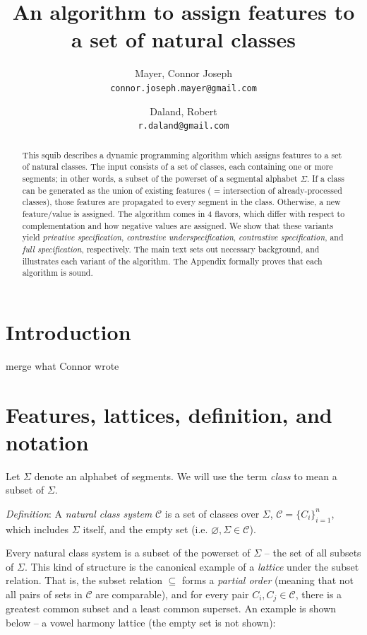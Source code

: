 \documentclass[11pt, oneside]{article}   	%
\title{An algorithm to assign features to a set of natural classes}
\author{}
\author{
  Mayer, Connor Joseph \\
  \texttt{connor.joseph.mayer@gmail.com}
  \and
  Daland, Robert \\
  \texttt{r.daland@gmail.com}
}
\begin{document}
\maketitle

\begin{abstract}
This squib describes a dynamic programming algorithm which assigns features to a set of natural classes. The input consists of a set of classes, each containing one or more segments; in other words, a subset of the powerset of a segmental alphabet $\Sigma$. If a class can be generated as the union of existing features ( = intersection of already-processed classes), those features are propagated to every segment in the class. Otherwise, a new feature/value is assigned. The algorithm comes in 4 flavors, which differ with respect to complementation and how negative values are assigned. We show that these variants yield \textit{privative specification}, \textit{contrastive underspecification}, \textit{contrastive specification}, and \textit{full specification}, respectively. The main text sets out necessary background, and illustrates each variant of the algorithm. The Appendix formally proves that each algorithm is sound.
\end{abstract}

\section{Introduction}
merge what Connor wrote

\section{Features, lattices, definition, and notation}

Let $\Sigma$ denote an alphabet of segments. We will use the term \textit{class} to mean a subset of $\Sigma$. 

\vspace{\baselineskip} \noindent \textit{Definition}:
        A \textit{natural class system} $\mathcal C$ is a set of classes over $\Sigma$, $\mathcal C = \{C_i\}_{i=1}^n$, which includes $\Sigma$ itself, and the empty set (i.e. $\varnothing , \Sigma \in \mathcal C$).

\vspace{\baselineskip} \noindent Every natural class system is a subset of the powerset of $\Sigma$ -- the set of all subsets of $\Sigma$. This kind of structure is the canonical example of a \textit{lattice} under the subset relation. That is, the subset relation $\subseteq$ forms a \textit{partial order} (meaning that not all pairs of sets in $\mathcal C$ are comparable), and for every pair $C_i, C_j \in \mathcal C$, there is a greatest common subset and a least common superset. An example is shown below -- a vowel harmony lattice (the empty set is not shown):
\end{document}
